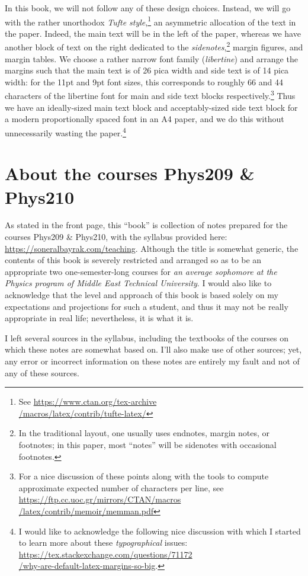 \hphantom{\indent} In this book, we will not follow any of these design choices. Instead, we will go with the rather unorthodox \emph{Tufte style},\footnote{See \href{https://www.ctan.org/tex-archive/macros/latex/contrib/tufte-latex/}{https://www.ctan.org/tex-archive\\/macros/latex/contrib/tufte-latex/}} an asymmetric allocation of the text in the paper. Indeed, the main text will be in the left of the paper, whereas we have another block of text on the right dedicated to the \emph{sidenotes},\footnote{In the traditional layout, one usually uses endnotes, margin notes, or footnotes; in this paper, most ``notes'' will be sidenotes with occasional footnotes.\bottomnotemark} margin figures, and margin tables. We choose a rather narrow font family (\emph{libertine}) and arrange the margins such that the main text is of 26 pica width and side text is of 14 pica width: for the 11pt and 9pt font sizes, this corresponds to roughly 66 and 44 characters of the libertine font for main and side text blocks respectively.\footnote{For a nice discussion of these points along with the tools to compute approximate expected number of characters per line, see \href{https://ftp.cc.uoc.gr/mirrors/CTAN/macros/latex/contrib/memoir/memman.pdf}{https://ftp.cc.uoc.gr/mirrors/CTAN/macros\\/latex/contrib/memoir/memman.pdf}} Thus we have an ideally-sized main text block and acceptably-sized side text block for a modern proportionally spaced font in an A4 paper, and we do this without unnecessarily wasting the paper.\footnote{I would like to acknowledge the following nice discussion with which I started to learn more about these \emph{typographical} issues: \href{https://tex.stackexchange.com/questions/71172/why-are-default-latex-margins-so-big}{https://tex.stackexchange.com/questions/71172\\/why-are-default-latex-margins-so-big}.}

\section{About the courses Phys209 \& Phys210}
As stated in the front page, this ``book'' is collection of notes prepared for the courses Phys209 \& Phys210, with the syllabus provided here:\\ \hyperref{https://soneralbayrak.com/teaching}{}{}{https://soneralbayrak.com/teaching}. Although the title is somewhat generic, the contents of this book is severely restricted and arranged so as to be an appropriate two one-semester-long courses for \emph{an average sophomore at the Physics program of Middle East Technical University}. I would also like to acknowledge that the level and approach of this book is based solely on my expectations and projections for such a student, and thus it may not be really appropriate in real life; nevertheless, it is what it is.

I left several sources in the syllabus, including the textbooks of the courses on which these notes are somewhat based on. I'll also make use of other sources; yet, any error or incorrect information on these notes are entirely my fault and not of any of these sources.